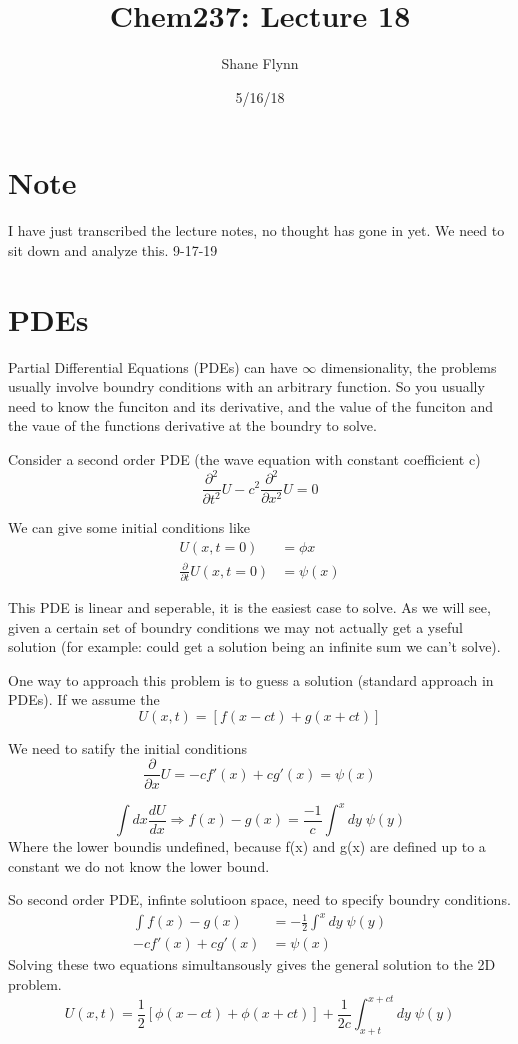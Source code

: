 \documentclass{article}
\title{Chem237: Lecture 18}
\date{5/16/18}
\author{Shane Flynn}
\newcommand{\be}{\begin{equation}}
\newcommand{\ee}{\end{equation}}
\newcommand{\pd}{\partial}
\newcommand{\half}{\frac{1}{2}}
\newcommand{\prt}{\frac{\pd}{\pd t}}
\newcommand{\prts}{\frac{\pd^2}{\pd t^2}}
\newcommand{\prx}{\frac{\pd}{\pd x}}
\newcommand{\prxs}{\frac{\pd^2}{\pd x^2}}
\begin{document}
\maketitle

\section{Note}
I have just transcribed the lecture notes, no thought has gone in yet. We need to sit down and analyze this. 9-17-19

\section{PDEs}
Partial Differential Equations (PDEs) can have $\infty$ dimensionality, the problems usually involve boundry conditions with an arbitrary function.
So you usually need to know the funciton and its derivative, and the value of the funciton and the vaue of the functions derivative at the boundry to solve.

Consider a second order PDE (the wave equation with constant coefficient c)
\be
\prts U - c^2 \prxs U = 0
\ee

We can give some initial conditions like
\be
\begin{split}
    U(x,t=0) &= \phi x\\
    \prt U (x,t=0) &= \psi(x)
\end{split}
\ee

This PDE is linear and seperable, it is the easiest case to solve.
As we will see, given a certain set of boundry conditions we may not actually get a yseful solution (for example: could get a solution being an infinite sum we can't solve).

One way to approach this problem is to guess a solution (standard approach in PDEs).
If we assume the
\be
U(x,t)=\left[f(x-ct)+g(x+ct)\right]
\ee

We need to satify the initial conditions
\be
\prx U = -cf'(x)+cg'(x) = \psi(x)
\ee

\be
\int dx \frac{dU}{dx} \Rightarrow f(x) - g(x) = \frac{-1}{c} \int^x dy\;\psi(y)
\ee
Where the lower boundis undefined, because f(x) and g(x) are defined up to a constant we do not know the lower bound.

So second order PDE, infinte solutioon space, need to specify boundry conditions.
\be\begin{split}
    \int f(x) - g(x) &=-\half\int^x dy\;\psi(y) \\
    -cf'(x) + cg'(x) &= \psi(x)
\end{split}
\ee
Solving these two equations simultansously gives the general solution to the 2D problem.
\be
U(x,t) = \half\left[\phi(x-ct)+\phi(x+ct)\right] + \frac{1}{2c} \int_{x+t}^{x+ct} dy \; \psi(y)
\ee
\end{document}
